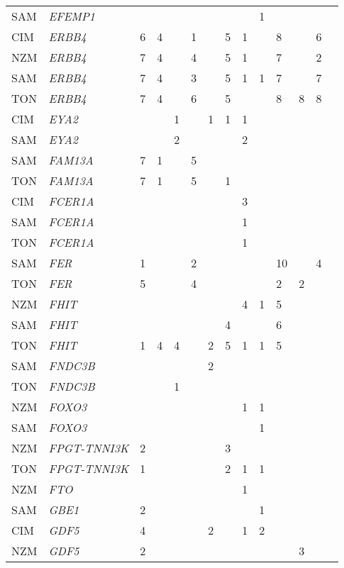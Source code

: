 \documentclass[]{report}
\begin{document}
\begin{ThreePartTable}
\begin{longtable}[t]{llllllllllllll}
SAM & \em{EFEMP1} &  &  &  &  &  &  &  & 1 &  &  &  & \\
CIM & \em{ERBB4} & 6 & 4 &  & 1 &  & 5 & 1 &  & 8 &  & 6 & \\
NZM & \em{ERBB4} & 7 & 4 &  & 4 &  & 5 & 1 &  & 7 &  & 2 & \\
SAM & \em{ERBB4} & 7 & 4 &  & 3 &  & 5 & 1 & 1 & 7 &  & 7 & \\
TON & \em{ERBB4} & 7 & 4 &  & 6 &  & 5 &  &  & 8 & 8 & 8 & \\
CIM & \em{EYA2} &  &  & 1 &  & 1 & 1 & 1 &  &  &  &  & \\
SAM & \em{EYA2} &  &  & 2 &  &  &  & 2 &  &  &  &  & \\
SAM & \em{FAM13A} & 7 & 1 &  & 5 &  &  &  &  &  &  &  & \\
TON & \em{FAM13A} & 7 & 1 &  & 5 &  & 1 &  &  &  &  &  & \\
CIM & \em{FCER1A} &  &  &  &  &  &  & 3 &  &  &  &  & \\
SAM & \em{FCER1A} &  &  &  &  &  &  & 1 &  &  &  &  & \\
TON & \em{FCER1A} &  &  &  &  &  &  & 1 &  &  &  &  & \\
SAM & \em{FER} & 1 &  &  & 2 &  &  &  &  & 10 &  & 4 & \\
TON & \em{FER} & 5 &  &  & 4 &  &  &  &  & 2 & 2 &  & \\
NZM & \em{FHIT} &  &  &  &  &  &  & 4 & 1 & 5 &  &  & \\
SAM & \em{FHIT} &  &  &  &  &  & 4 &  &  & 6 &  &  & \\
TON & \em{FHIT} & 1 & 4 & 4 &  & 2 & 5 & 1 & 1 & 5 &  &  & \\
SAM & \em{FNDC3B} &  &  &  &  & 2 &  &  &  &  &  &  & \\
TON & \em{FNDC3B} &  &  & 1 &  &  &  &  &  &  &  &  & \\
NZM & \em{FOXO3} &  &  &  &  &  &  & 1 & 1 &  &  &  & \\
SAM & \em{FOXO3} &  &  &  &  &  &  &  & 1 &  &  &  & \\
NZM & \em{FPGT-TNNI3K} & 2 &  &  &  &  & 3 &  &  &  &  &  & \\
TON & \em{FPGT-TNNI3K} & 1 &  &  &  &  & 2 & 1 & 1 &  &  &  & \\
NZM & \em{FTO} &  &  &  &  &  &  & 1 &  &  &  &  & \\
SAM & \em{GBE1} & 2 &  &  &  &  &  &  & 1 &  &  &  & \\
CIM & \em{GDF5} & 4 &  &  &  & 2 &  & 1 & 2 &  &  &  & \\
NZM & \em{GDF5} & 2 &  &  &  &  &  &  &  &  & 3 &  & \\

\end{longtable}
\end{ThreePartTable}
\end{document}
